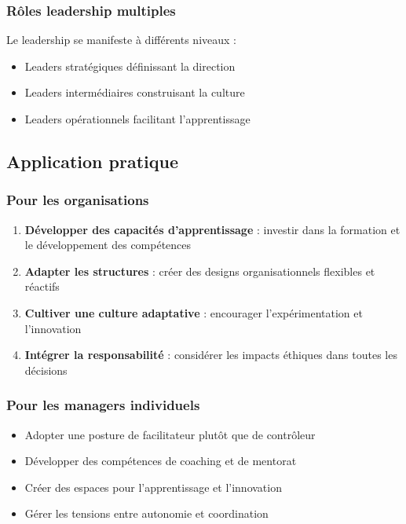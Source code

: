 \documentclass[12pt,a4paper]{article}
\begin{document}
\subsubsection{Rôles leadership multiples}
Le leadership se manifeste à différents niveaux :
\begin{itemize}
    \item Leaders stratégiques définissant la direction
    \item Leaders intermédiaires construisant la culture
    \item Leaders opérationnels facilitant l'apprentissage
\end{itemize}

\subsection{Application pratique}

\subsubsection{Pour les organisations}
\begin{enumerate}
    \item \textbf{Développer des capacités d'apprentissage} : investir dans la formation et le développement des compétences
    \item \textbf{Adapter les structures} : créer des designs organisationnels flexibles et réactifs
    \item \textbf{Cultiver une culture adaptative} : encourager l'expérimentation et l'innovation
    \item \textbf{Intégrer la responsabilité} : considérer les impacts éthiques dans toutes les décisions
\end{enumerate}

\subsubsection{Pour les managers individuels}
\begin{itemize}
    \item Adopter une posture de facilitateur plutôt que de contrôleur
    \item Développer des compétences de coaching et de mentorat
    \item Créer des espaces pour l'apprentissage et l'innovation
    \item Gérer les tensions entre autonomie et coordination
\end{itemize}
\end{document}
